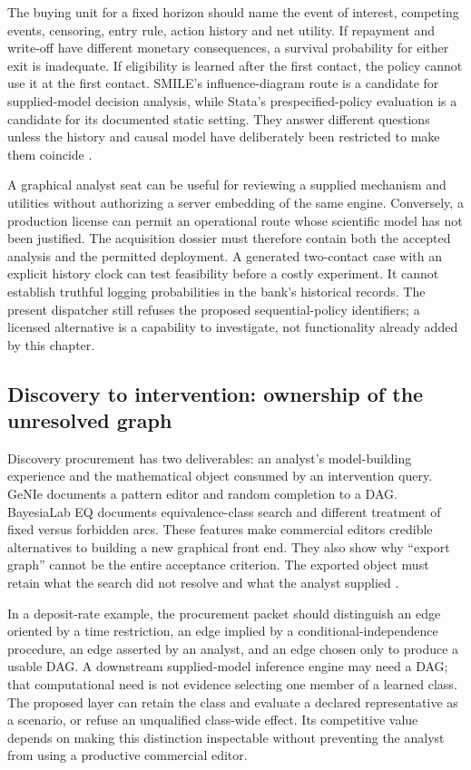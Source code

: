 The buying unit for a fixed horizon should name the event of interest, competing
events, censoring, entry rule, action history and net utility. If repayment and
write-off have different monetary consequences, a survival probability for
either exit is inadequate. If eligibility is learned after the first contact,
the policy cannot use it at the first contact. SMILE's influence-diagram route
is a candidate for supplied-model decision analysis, while Stata's
prespecified-policy evaluation is a candidate for its documented static
setting. They answer different questions unless the history and causal model
have deliberately been restricted to make them coincide
\citep{exec16_cp_bayesfusion,exec13_ch_stata}.

A graphical analyst seat can be useful for reviewing a supplied mechanism and
utilities without authorizing a server embedding of the same engine. Conversely,
a production license can permit an operational route whose scientific model
has not been justified. The acquisition dossier must therefore contain both
the accepted analysis and the permitted deployment. A generated two-contact
case with an explicit history clock can test feasibility before a costly
experiment. It cannot establish truthful logging probabilities in the bank's
historical records. The present dispatcher still refuses the proposed
sequential-policy identifiers; a licensed alternative is a capability to
investigate, not functionality already added by this chapter.

\subsection{Discovery to intervention: ownership of the unresolved graph}

Discovery procurement has two deliverables: an analyst's model-building
experience and the mathematical object consumed by an intervention query.
GeNIe documents a pattern editor and random completion to a DAG. BayesiaLab EQ
documents equivalence-class search and different treatment of fixed versus
forbidden arcs. These features make commercial editors credible alternatives
to building a new graphical front end. They also show why ``export graph''
cannot be the entire acceptance criterion. The exported object must retain
what the search did not resolve and what the analyst supplied
\citep{exec13_genie_pattern,exec13_bayesia_eq}.

In a deposit-rate example, the procurement packet should distinguish an edge
oriented by a time restriction, an edge implied by a conditional-independence
procedure, an edge asserted by an analyst, and an edge chosen only to produce
a usable DAG. A downstream supplied-model inference engine may need a DAG;
that computational need is not evidence selecting one member of a learned
class. The proposed layer can retain the class and evaluate a declared
representative as a scenario, or refuse an unqualified class-wide effect. Its
competitive value depends on making this distinction inspectable without
preventing the analyst from using a productive commercial editor.

